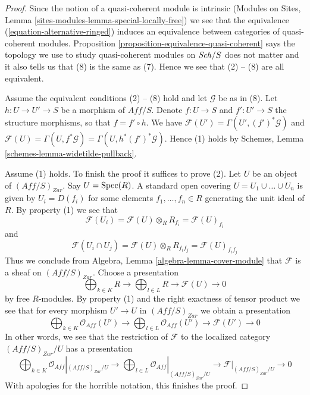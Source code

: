 \begin{proof}
Since the notion of a quasi-coherent module is intrinsic
(Modules on Sites, Lemma \ref{sites-modules-lemma-special-locally-free})
we see that the equivalence (\ref{equation-alternative-ringed})
induces an equivalence between categories of quasi-coherent modules.
Proposition \ref{proposition-equivalence-quasi-coherent}
says the topology we use to study quasi-coherent modules on
$\mathit{Sch}/S$ does not matter and it also tells us that (8)
is the same as (7). Hence we see that (2) -- (8) are all equivalent.

\medskip\noindent
Assume the equivalent conditions (2) -- (8) hold and let
$\mathcal{G}$ be as in (8). Let $h : U \to U' \to S$ be a morphism
of $\textit{Aff}/S$. Denote $f : U \to S$ and $f' : U' \to S$ the
structure morphisms, so that $f = f' \circ h$.
We have $\mathcal{F}(U') = \Gamma(U', (f')^*\mathcal{G})$ and
$\mathcal{F}(U) = \Gamma(U, f^*\mathcal{G}) = \Gamma(U, h^*(f')^*\mathcal{G})$.
Hence (1) holds by Schemes, Lemma \ref{schemes-lemma-widetilde-pullback}.

\medskip\noindent
Assume (1) holds. To finish the proof it suffices to prove (2).
Let $U$ be an object of $(\textit{Aff}/S)_{Zar}$.
Say $U = \mathop{\mathrm{Spec}}(R)$. A standard open covering $U = U_1 \cup \ldots \cup U_n$
is given by $U_i = D(f_i)$ for some elements $f_1, \ldots, f_n \in R$
generating the unit ideal of $R$. By property (1) we see that
$$
\mathcal{F}(U_i) =
\mathcal{F}(U) \otimes_R R_{f_i} =
\mathcal{F}(U)_{f_i}
$$
and
$$
\mathcal{F}(U_i \cap U_j) =
\mathcal{F}(U) \otimes_R R_{f_if_j} =
\mathcal{F}(U)_{f_if_j}
$$
Thus we conclude from Algebra, Lemma \ref{algebra-lemma-cover-module}
that $\mathcal{F}$ is a sheaf on $(\textit{Aff}/S)_{Zar}$. Choose a
presentation
$$
\bigoplus\nolimits_{k \in K} R
\longrightarrow
\bigoplus\nolimits_{l \in L} R
\longrightarrow
\mathcal{F}(U)
\longrightarrow 0
$$
by free $R$-modules. By property (1) and the right exactness of tensor product
we see that for every morphism $U' \to U$ in $(\textit{Aff}/S)_{Zar}$
we obtain a presentation
$$
\bigoplus\nolimits_{k \in K} \mathcal{O}_{Aff}(U')
\longrightarrow
\bigoplus\nolimits_{l \in L} \mathcal{O}_{Aff}(U')
\longrightarrow
\mathcal{F}(U')
\longrightarrow 0
$$
In other words, we see that the restriction of $\mathcal{F}$
to the localized category $(\textit{Aff}/S)_{Zar}/U$ has a presentation
$$
\bigoplus\nolimits_{k \in K} \mathcal{O}_{Aff}|_{(\textit{Aff}/S)_{Zar}/U}
\longrightarrow
\bigoplus\nolimits_{l \in L} \mathcal{O}_{Aff}|_{(\textit{Aff}/S)_{Zar}/U}
\longrightarrow
\mathcal{F}|_{(\textit{Aff}/S)_{Zar}/U}
\longrightarrow 0
$$
With apologies for the horrible notation, this finishes the proof.
\end{proof}

